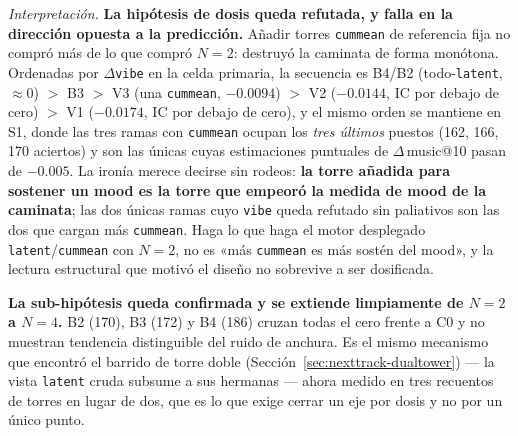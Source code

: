 \documentclass[11pt]{article}
\begin{document}
\emph{Interpretación.} \textbf{La hipótesis de dosis queda refutada, y falla en la
dirección opuesta a la predicción.} Añadir torres \texttt{cummean} de referencia
fija no compró más de lo que compró $N=2$: destruyó la caminata de forma
monótona. Ordenadas por $\Delta$\texttt{vibe} en la celda primaria, la secuencia es
B4/B2 (todo-\texttt{latent}, ${\approx}0$) $>$ B3 $>$ V3 (una \texttt{cummean},
$-\num{0.0094}$) $>$ V2 ($-\num{0.0144}$, IC por debajo de cero) $>$ V1
($-\num{0.0174}$, IC por debajo de cero), y el mismo orden se mantiene en S1,
donde las tres ramas con \texttt{cummean} ocupan los \emph{tres últimos} puestos
(\num{162}, \num{166}, \num{170} aciertos) y son las únicas cuyas estimaciones
puntuales de $\Delta$\,music@10 pasan de $-\num{0.005}$. La ironía merece decirse
sin rodeos: \textbf{la torre añadida para sostener un mood es la torre que empeoró
la medida de mood de la caminata}; las dos únicas ramas cuyo \texttt{vibe} queda
refutado sin paliativos son las dos que cargan más \texttt{cummean}. Haga lo que
haga el motor desplegado \texttt{latent}/\texttt{cummean} con $N=2$, no es «más
\texttt{cummean} es más sostén del mood», y la lectura estructural que motivó el
diseño no sobrevive a ser dosificada.

\textbf{La sub-hipótesis queda confirmada y se extiende limpiamente de $N=2$ a
$N=4$.} B2 (\num{170}), B3 (\num{172}) y B4 (\num{186}) cruzan todas el cero
frente a C0 y no muestran tendencia distinguible del ruido de anchura. Es el mismo
mecanismo que encontró el barrido de torre doble (Sección~\ref{sec:nexttrack-dualtower})
--- la vista \texttt{latent} cruda subsume a sus hermanas --- ahora medido en tres
recuentos de torres en lugar de dos, que es lo que exige cerrar un eje por dosis y
no por un único punto.
\end{document}
